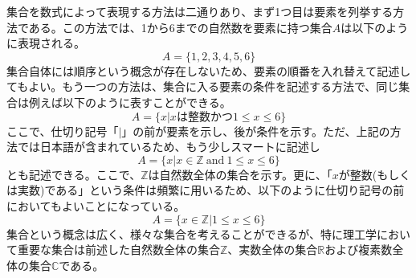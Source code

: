 集合を数式によって表現する方法は二通りあり、まず1つ目は要素を列挙する方法である。この方法では、1から6までの自然数を要素に持つ集合\(A\)は以下のように表現される。
\begin{equation}
	A=\{1,2,3,4,5,6\}
\end{equation}
集合自体には順序という概念が存在しないため、要素の順番を入れ替えて記述してもよい。もう一つの方法は、集合に入る要素の条件を記述する方法で、同じ集合は例えば以下のように表すことができる。
\begin{equation}
	A=\{x|xは整数かつ1\leq x \leq 6\}
\end{equation}
ここで、仕切り記号「\(|\)」の前が要素を示し、後が条件を示す。ただ、上記の方法では日本語が含まれているため、もう少しスマートに記述し
\begin{equation}
	A=\{x|x\in \mathbb{Z} \ \mathrm{and} \  1\leq x \leq 6\}
\end{equation}
とも記述できる。ここで、\(\mathbb{Z}\)は自然数全体の集合を示す。更に、「\(x\)が整数(もしくは実数)である」という条件は頻繁に用いるため、以下のように仕切り記号の前においてもよいことになっている。
\begin{equation}
	A=\{x\in \mathbb{Z} | 1\leq x \leq 6\}
\end{equation}
集合という概念は広く、様々な集合を考えることができるが、特に理工学において重要な集合は前述した自然数全体の集合\(\mathbb{Z}\)、実数全体の集合\(\mathbb{R}\)および複素数全体の集合\(\mathbb{C}\)である。

